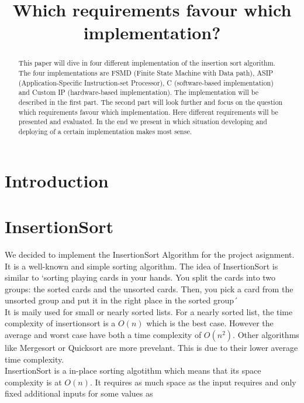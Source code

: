 \documentclass[conference]{IEEEtran}
\begin{document}
\title{Which requirements favour which implementation? \\}

\maketitle

\begin{abstract}
This paper will dive in four different implementation of the insertion sort algorithm. The four implementations are FSMD (Finite State Machine with Data path), ASIP (Application-Specific Instruction-set Processor), C (software-based implementation) and Custom IP (hardware-based implementation). The implementation will be described in the first part. The second part will look further and focus on the question which requirements favour which implementation. Here different requirements will be presented and evaluated. In the end we present in which situation developing and deploying of a certain implementation makes most sense. 
\end{abstract}

\section{Introduction}

\section{InsertionSort}
We decided to implement the InsertionSort Algorithm for the project asignment. It is a well-known and simple sorting algorithm. The idea of InsertionSort is similar to `sorting playing cards in your hands. You split the cards into two groups: the sorted cards and the unsorted cards. Then, you pick a card from the unsorted group and put it in the right place in the sorted group´~\cite{g4g}\\
It is maily used for small or nearly sorted lists. For a nearly sorted list, the time complexity of insertionsort is a $O(n)$ which is the best case. However the average and worst case have both a time complexity of $O(n^2)$. Other algorithms like Mergesort or Quicksort are more prevelant. This is due to their lower average time complexity.\\
InsertionSort is a in-place sorting algotithm which means that its space complexity is at $O(n)$. It requires as much space as the input requires and only fixed additional inputs for some values as 
\end{document}
